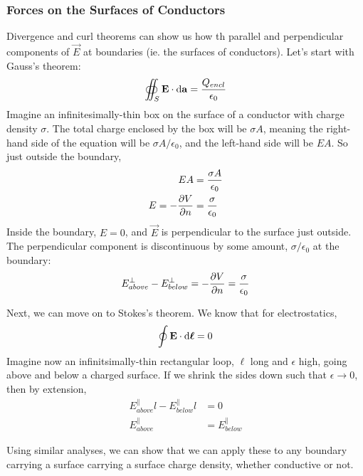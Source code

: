 \documentclass[a4paper]{article}
\begin{document}
\subsubsection{Forces on the Surfaces of Conductors}
Divergence and curl theorems can show us how th parallel and perpendicular
components of $\vec{E}$ at boundaries (ie. the surfaces of conductors).
Let's start with Gauss's theorem:
\[ \oiint_S \boldsymbol{\mathbf{E}}\cdot\mathrm{d}\boldsymbol{\mathbf{a}} = \frac{Q_{encl}}{\epsilon_0} \]
Imagine an infinitesimally-thin box on the surface of a conductor with
charge density $\sigma$. The total charge enclosed by the box will be
$\sigma A$, meaning the right-hand side of the equation will be
$\sigma A/\epsilon_0$, and the left-hand side will be $EA$. So just outside the
boundary,
\begin{align*}
	EA &= \frac{\sigma A}{\epsilon_0}\\
	E = -\frac{\partial V}{\partial n} &= \frac{\sigma}{\epsilon_0}
\end{align*}
Inside the boundary, $E = 0$, and $\vec{E}$ is perpendicular to the surface
just outside. The perpendicular component is discontinuous by some amount,
$\sigma/\epsilon_0$ at the boundary:
\[
	E_{above}^\perp - E_{below}^\perp = -\frac{\partial V}{\partial n}
	= \frac{\sigma}{\epsilon_0}
\]

Next, we can move on to Stokes's theorem. We know that for electrostatics,
\[ \oint \boldsymbol{\mathbf{E}}\cdot\mathrm{d}\boldsymbol{\mathbf{\ell}} = 0 \]
Imagine now an infinitsimally-thin rectangular loop, $\ell$ long and
$\epsilon$ high, going above and below a charged surface. If we shrink the
sides down such that $\epsilon\to0$, then by extension,
\begin{align*}
	E_{above}^\parallel l - E_{below}^\parallel l &= 0\\
	E_{above}^\parallel &= E_{below}^\parallel
\end{align*}

Using similar analyses, we can show that we can apply these to any boundary
carrying a surface carrying a surface charge density, whether conductive or
not.
\end{document}
